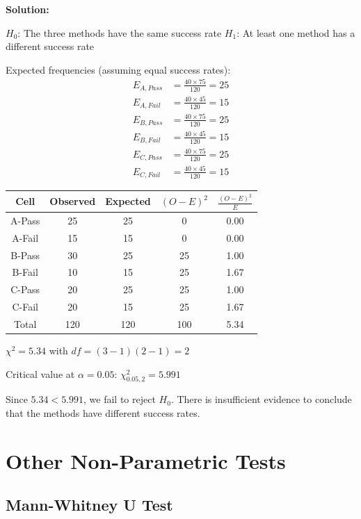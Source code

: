 \documentclass[twoside]{book}
\begin{document}
\textbf{Solution:}

$H_0$: The three methods have the same success rate
$H_1$: At least one method has a different success rate

Expected frequencies (assuming equal success rates):
\begin{align}
E_{A,Pass} &= \frac{40 \times 75}{120} = 25 \\
E_{A,Fail} &= \frac{40 \times 45}{120} = 15 \\
E_{B,Pass} &= \frac{40 \times 75}{120} = 25 \\
E_{B,Fail} &= \frac{40 \times 45}{120} = 15 \\
E_{C,Pass} &= \frac{40 \times 75}{120} = 25 \\
E_{C,Fail} &= \frac{40 \times 45}{120} = 15
\end{align}

\begin{center}
\begin{tabular}{|c|c|c|c|c|}
\hline
Cell & Observed & Expected & $(O-E)^2$ & $\frac{(O-E)^2}{E}$ \\
\hline
A-Pass & 25 & 25 & 0 & 0.00 \\
A-Fail & 15 & 15 & 0 & 0.00 \\
B-Pass & 30 & 25 & 25 & 1.00 \\
B-Fail & 10 & 15 & 25 & 1.67 \\
C-Pass & 20 & 25 & 25 & 1.00 \\
C-Fail & 20 & 15 & 25 & 1.67 \\
\hline
Total & 120 & 120 & 100 & 5.34 \\
\hline
\end{tabular}
\end{center}

$\chi^2 = 5.34$ with $df = (3-1)(2-1) = 2$

Critical value at $\alpha = 0.05$: $\chi^2_{0.05,2} = 5.991$

Since $5.34 < 5.991$, we fail to reject $H_0$. There is insufficient evidence to conclude that the methods have different success rates.

\section{Other Non-Parametric Tests}

\subsection{Mann-Whitney U Test}
\end{document}
